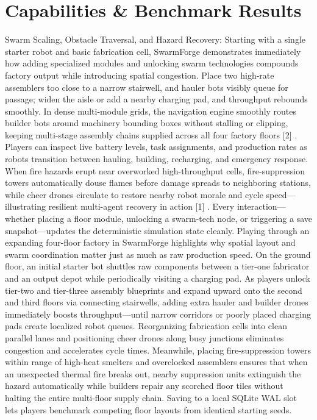 \documentclass[10pt,letterpaper]{article}
\begin{document}
\section{Capabilities \& Benchmark Results}
Swarm Scaling, Obstacle Traversal, and Hazard Recovery: Starting with a single starter robot and basic fabrication cell, SwarmForge demonstrates immediately how adding specialized modules and unlocking swarm technologies compounds factory output while introducing spatial congestion. Place two high-rate assemblers too close to a narrow stairwell, and hauler bots visibly queue for passage; widen the aisle or add a nearby charging pad, and throughput rebounds smoothly. In dense multi-module grids, the navigation engine smoothly routes builder bots around machinery bounding boxes without stalling or clipping, keeping multi-stage assembly chains supplied across all four factory floors [2] . Players can inspect live battery levels, task assignments, and production rates as robots transition between hauling, building, recharging, and emergency response. When fire hazards erupt near overworked high-throughput cells, fire-suppression towers automatically douse flames before damage spreads to neighboring stations, while cheer drones circulate to restore nearby robot morale and cycle speed---illustrating resilient multi-agent recovery in action [1] . Every interaction---whether placing a floor module, unlocking a swarm-tech node, or triggering a save snapshot---updates the deterministic simulation state cleanly. Playing through an expanding four-floor factory in SwarmForge highlights why spatial layout and swarm coordination matter just as much as raw production speed. On the ground floor, an initial starter bot shuttles raw components between a tier-one fabricator and an output depot while periodically visiting a charging pad. As players unlock tier-two and tier-three assembly blueprints and expand upward onto the second and third floors via connecting stairwells, adding extra hauler and builder drones immediately boosts throughput---until narrow corridors or poorly placed charging pads create localized robot queues. Reorganizing fabrication cells into clean parallel lanes and positioning cheer drones along busy junctions eliminates congestion and accelerates cycle times. Meanwhile, placing fire-suppression towers within range of high-heat smelters and overclocked assemblers ensures that when an unexpected thermal fire breaks out, nearby suppression units extinguish the hazard automatically while builders repair any scorched floor tiles without halting the entire multi-floor supply chain. Saving to a local SQLite WAL slot lets players benchmark competing floor layouts from identical starting seeds.
\end{document}

